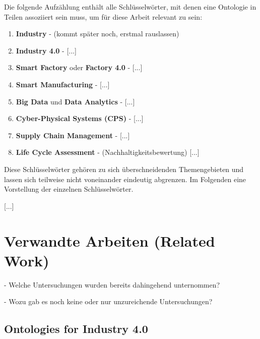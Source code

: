 \documentclass{article}
\begin{document}
Die folgende Aufzählung enthält alle Schlüsselwörter, mit denen eine Ontologie in Teilen assoziiert sein muss, um für diese Arbeit relevant zu sein:

\begin{enumerate}
    \item \textbf{Industry} - (kommt später noch, erstmal rauslassen)
    \item \textbf{Industry 4.0} - [...]
    \item \textbf{Smart Factory} oder \textbf{Factory 4.0} - [...]
    \item \textbf{Smart Manufacturing} - [...]
    \item \textbf{Big Data} und \textbf{Data Analytics} - [...]
    \item \textbf{Cyber-Physical Systems (CPS)} - [...]
    \item \textbf{Supply Chain Management} - [...]
    \item \textbf{Life Cycle Assessment} - (Nachhaltigkeitsbewertung) [...]
\end{enumerate}

Diese Schlüsselwörter gehören zu sich überschneidenden Themengebieten und lassen sich teilweise nicht voneinander eindeutig abgrenzen.
Im Folgenden eine Vorstellung der einzelnen Schlüsselwörter.

[...]

\section{Verwandte Arbeiten (Related Work)}

- Welche Untersuchungen wurden bereits dahingehend unternommen?

- Wozu gab es noch keine oder nur unzureichende Untersuchungen?

\subsection{Ontologies for Industry 4.0}
%
\end{document}

